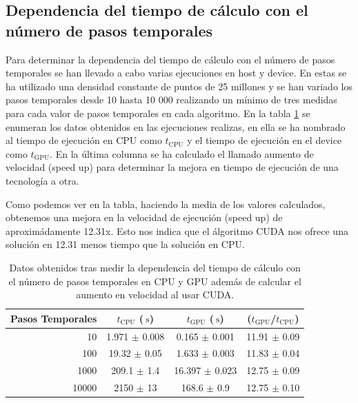 \documentclass[11pt,a4paper,twoside,pdf]{article}
\numberwithin{equation}{section}
\begin{document}
\subsection{Dependencia del tiempo de cálculo con el número de pasos temporales} \label{Subsection:Variacion pasos temporales}

Para determinar la dependencia del tiempo de cálculo con el número de pasos temporales se han llevado a cabo varias ejecuciones en host y device. En estas se ha utilizado una densidad constante de puntos de 25 millones y se han variado los pasos temporales desde 10 hasta 10 000 realizando un mínimo de tres medidas para cada valor de pasos temporales en cada algoritmo. En la tabla  \ref{tab:npasos} se enumeran los datos obtenidos en las ejecuciones realizas, en ella se ha nombrado al tiempo de ejecución en CPU como $t_\text{CPU}$ y el tiempo de ejecución en el device como $t_\text{GPU}$. En la última columna se ha calculado el llamado aumento de velocidad (speed up) para determinar la mejora en tiempo de ejecución de una tecnología a otra.

Como podemos ver en la tabla, haciendo la media de los valores calculados, obtenemos una mejora en la velocidad de ejecución (speed up) de aproximádamente 12.31x. Esto nos indica que el álgoritmo CUDA nos ofrece una solución en 12.31 menos tiempo que la solución en CPU.

\begin{table}[h]
    \centering
    \begin{tabular}{|r|c|c|c|}
    \hline
    Pasos Temporales &  $t_\text{CPU}$ ($\SI{}{\second}$)  & $t_\text{GPU}$ ($\SI{}{\second}$) &  ($t_\text{GPU}$/$t_\text{CPU}$)  \\ \hline \hline
     10 & 1.971 $\pm$ 0.008 & 0.165 $\pm$ 0.001 & 11.91 $\pm$ 0.09\\ \hline
     100 & 19.32 $\pm$ 0.05 & 1.633 $\pm$ 0.003 & 11.83 $\pm$ 0.04\\ \hline
     1000 & 209.1 $\pm$ 1.4 & 16.397 $\pm$ 0.023 & 12.75 $\pm$ 0.09\\ \hline
     10000 & 2150 $\pm$ 13 & 168.6 $\pm$ 0.9 & 12.75 $\pm$ 0.10\\ \hline
    \end{tabular}
    \caption{Datos obtenidos tras medir la dependencia del tiempo de cálculo con el número de pasos temporales en CPU y GPU además de calcular el aumento en velocidad al usar CUDA.}
    \label{tab:npasos}
\end{table}
\end{document}
